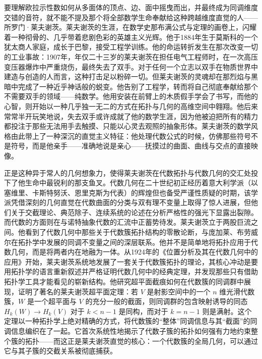 \documentclass[12pt,a4paper]{article}
\begin{document}
要理解欧拉示性数如何从多面体的顶点、边、面中摇曳而出，并最终成为同调维度交错的音符，就不能不提及那个将全部数学生命奉献给这种跨越维度直觉的人——所罗门·莱夫谢茨。莱夫谢茨的生涯，在数学史那布满公式与定理的画卷上，闪耀着一种彻骨的、几乎带着悲剧色彩的英雄主义光辉。他于1884年生于莫斯科的一个犹太商人家庭，成长于巴黎，接受工程学训练。他的命运转折发生在那次改变一切的工业事故：1907年，年仅二十三岁的莱夫谢茨在担任电气工程师时，在一次高压变压器爆炸中严重烧伤，最终失去了双手。对于任何一个立志以双手在物质世界中建造与创造的人而言，这种打击足以粉碎一切。但莱夫谢茨的灵魂却在那烈焰与黑暗中完成了一种近乎神话般的蜕变。他告别了工程学，转而将自己彻底奉献给那个不需要双手的领域——纯数学。他用安装在前臂上的木质假手学会了书写，而他的心智，则开始以一种几乎独一无二的方式在拓扑与几何的高维空间中翱翔。他后来常常半开玩笑地说，失去双手或许成就了他的数学生涯，因为他被迫把所有的精力都投注于那些无法用手去触摸、只能以心灵去观照的抽象形体。莱夫谢茨的数学风格由此带上了一种深沉的直觉主义特征：他处理代数公式的时候，仿佛那些符号不是符号，而是他亲手——准确地说是亲心——抚摸过的曲面、曲线与交点的直接映像。

正是这种异于常人的几何想象力，使得莱夫谢茨在代数拓扑与代数几何的交汇处投下了他生命中最锐利的那支鱼叉。代数几何在二十世纪初正经历着意大利学派（以塞维里、卡斯特努沃、恩里克斯为代表）的辉煌但也备受严谨性质疑的时期，该学派凭借深刻的几何直觉在代数曲面的分类与双有理不变量上取得了惊人进展，但他们关于交截理论、典范除子、连续系统的论述在分析严格性的强光下显露出裂隙。而代数的方面则在与诺特抽象代数的汇流中正蓄势待发。莱夫谢茨立于两股巨流之间。他看到了代数几何中那些关于代数簇拓扑结构的零散论断，与庞加莱、布劳威尔在拓扑学中发展的同调不变量之间的深层联系。他并不是简单地将拓扑应用于代数几何，而是将两者内在地融为一体。从1924年的《位置分析及其在代数几何中的应用》开始，莱夫谢茨系统地发展了一套关于代数簇拓扑的理论，其核心冲动是要用拓扑学的语言重新叙述并严格证明代数几何中的经典定理，并发现那些只有借助拓扑学工具才能看见的崭新结构。他研究超平面截痕如何在代数簇的同调群中展现，证明了著名的莱夫谢茨超平面定理：若 $V$ 是射影空间中的一个 $n$ 维光滑代数簇，$W$ 是一个超平面与 $V$ 的充分一般的截面，则同调群的包含映射诱导的同态 $H_k(W) \to H_k(V)$ 对于 $k < n-1$ 是同构，而对于 $k = n-1$ 则是满射。这个定理以一种拓扑学上绝对精确的方式，将代数簇的“整体”同调信息与其“截面”的同调信息编织在了一起。它首次系统性地揭示了代数子簇的拓扑如何强有力地约束整个簇的拓扑——而这正是莱夫谢茨直觉的核心：一个代数簇的全局几何，可以通过它与其子簇的交截关系被彻底捕获。
\end{document}
